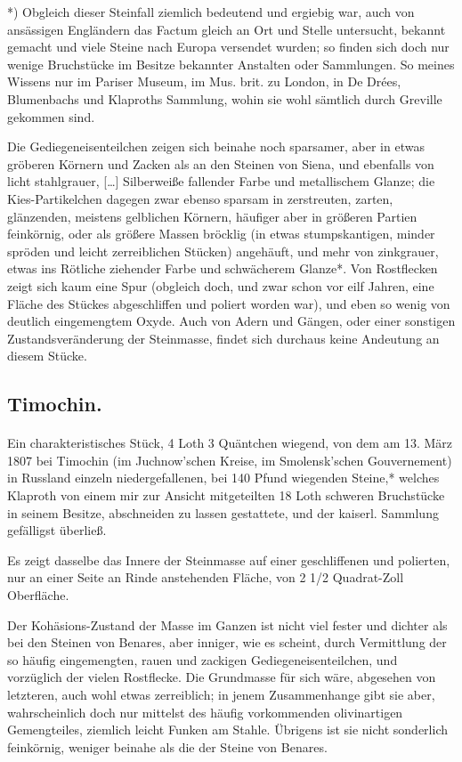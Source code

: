 \documentclass[a4paper, 11pt, oneside, german]{article}
\begin{document}
*) Obgleich dieser Steinfall ziemlich bedeutend und ergiebig war, auch von ansässigen Engländern das Factum gleich an Ort und Stelle untersucht, bekannt gemacht und viele Steine nach Europa versendet wurden; so finden sich doch nur wenige Bruchstücke im Besitze bekannter Anstalten oder Sammlungen. So meines Wissens nur im Pariser Museum, im Mus. brit. zu London, in De Drées, Blumenbachs und Klaproths Sammlung, wohin sie wohl sämtlich durch Greville gekommen sind.

Die Gediegeneisenteilchen zeigen sich beinahe noch sparsamer, aber in etwas gröberen Körnern und Zacken als an den Steinen von Siena, und ebenfalls von licht stahlgrauer, […] Silberweiße fallender Farbe und metallischem Glanze; die Kies-Partikelchen dagegen zwar ebenso sparsam in zerstreuten, zarten, glänzenden, meistens gelblichen Körnern, häufiger aber in größeren Partien feinkörnig, oder als größere Massen bröcklig (in etwas stumpskantigen, minder spröden und leicht zerreiblichen Stücken) angehäuft, und mehr von zinkgrauer, etwas ins Rötliche ziehender Farbe und schwächerem Glanze*. Von Rostflecken zeigt sich kaum eine Spur (obgleich doch, und zwar schon vor eilf Jahren, eine Fläche des Stückes abgeschliffen und poliert worden war), und eben so wenig von deutlich eingemengtem Oxyde. Auch von Adern und Gängen, oder einer sonstigen Zustandsveränderung der Steinmasse, findet sich durchaus keine Andeutung an diesem Stücke.

\subsection{Timochin.}
\paragraph{}
Ein charakteristisches Stück, 4 Loth 3 Quäntchen wiegend, von dem am 13. März 1807 bei Timochin (im Juchnow'schen Kreise, im Smolensk'schen Gouvernement) in Russland einzeln niedergefallenen, bei 140 Pfund wiegenden Steine,* welches Klaproth von einem mir zur Ansicht mitgeteilten 18 Loth schweren Bruchstücke in seinem Besitze, abschneiden zu lassen gestattete, und der kaiserl. Sammlung gefälligst überließ.

Es zeigt dasselbe das Innere der Steinmasse auf einer geschliffenen und polierten, nur an einer Seite an Rinde anstehenden Fläche, von 2 1/2 Quadrat-Zoll Oberfläche.

Der Kohäsions-Zustand der Masse im Ganzen ist nicht viel fester und dichter als bei den Steinen von Benares, aber inniger, wie es scheint, durch Vermittlung der so häufig eingemengten, rauen und zackigen Gediegeneisenteilchen, und vorzüglich der vielen Rostflecke. Die Grundmasse für sich wäre, abgesehen von letzteren, auch wohl etwas zerreiblich; in jenem Zusammenhange gibt sie aber, wahrscheinlich doch nur mittelst des häufig vorkommenden olivinartigen Gemengteiles, ziemlich leicht Funken am Stahle. Übrigens ist sie nicht sonderlich feinkörnig, weniger beinahe als die der Steine von Benares.
\end{document}
